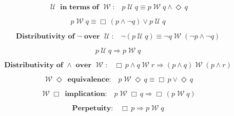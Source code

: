 \documentclass[12pt, fleqn, leqno]{article}
\newcommand{\impl}{\ensuremath{\Rightarrow}}        %
\newcommand{\Until}{\;\mathcal{U}\;}
\newcommand{\Wait}{\;\mathcal{W}\;}
\newcommand{\Event}{\Diamond\,}
\newcommand{\Always}{\Box\,}
\newcommand{\spacer}{\vspace{-30pt}}
\begin{document}
\spacer

\begin{equation}\label{E:untilFromWait}
\textbf{$\Until$ in terms of $\Wait$:}\quad p \Until q \equiv p \Wait q\land \Event q
\end{equation}

\spacer
\begin{equation}\label{E:EmersonEquiv}
p \Wait q  \equiv \Always (p \land \neg q) \lor p \Until q
\end{equation}

\spacer

\begin{equation}\label{E:notUntil}
\textbf{Distributivity of $\neg$ over $\Until$:}\quad \neg (p \Until q) \equiv \neg q \Wait (\neg p \land \neg q)
\end{equation}

\spacer

\begin{equation}\label{E:untilImplWait}
p\Until q\impl p\Wait q
\end{equation}

\spacer

\begin{equation}\label{E:andWaitDist}
\textbf{Distributivity of $\land$ over $\Wait$:}\quad \Always p \land q \Wait r \impl (p \land q) \Wait (p \land r)
\end{equation}

\spacer

\begin{equation}\label{E:EventWaitequiv}
\textbf{$\Wait\Event$ equivalence:}\quad p\Wait\Event q \equiv \Always p \lor \Event q
\end{equation}

\spacer

\begin{equation}\label{E:alwaysWaitImpl}
\textbf{$\Wait\Always$ implication:}\quad p\Wait\Always q \impl\Always (p \Wait q)
\end{equation}

\spacer

\begin{equation}\label{E:alwaysImpWait}
\textbf{Perpetuity:}\quad \Always p \impl p \Wait q
\end{equation}
\end{document}
